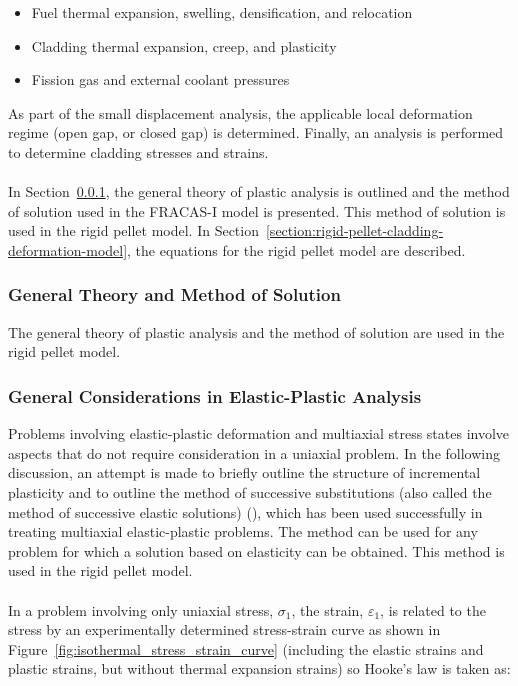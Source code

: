 \begin{itemize}
    \item Fuel thermal expansion, swelling, densification, and relocation

    \item Cladding thermal expansion, creep, and plasticity

    \item Fission gas and external coolant pressures

\end{itemize}

As part of the small displacement analysis, the applicable local deformation regime (open gap, or
closed gap) is determined. Finally, an analysis is performed to determine cladding stresses and
strains.
\\
\\
In Section~\ref{section:general-theory-and-method-of-solution}, the general theory of plastic
analysis is outlined and the method of solution used in the FRACAS-I model is presented. This method
of solution is used in the rigid pellet model. In
Section~\ref{section:rigid-pellet-cladding-deformation-model}, the equations for the rigid pellet
model are described.
\subsubsection{General Theory and Method of Solution}\label{section:general-theory-and-method-of-solution}

The general theory of plastic analysis and the method of solution are
used in the rigid pellet model.

\subsubsection{General Considerations in Elastic-Plastic Analysis}\label{section:general-considerations-in-elastic-plastic-analysis}

Problems involving elastic-plastic deformation and multiaxial stress states involve aspects that do
not require consideration in a uniaxial problem. In the following discussion, an attempt is made to
briefly outline the structure of incremental plasticity and to outline the method of successive
substitutions (also called the method of successive elastic solutions) (\cite{ref:Mendelson1968a}),
which has been used successfully in treating multiaxial elastic-plastic problems. The method can be
used for any problem for which a solution based on elasticity can be obtained.  This method is used
in the rigid pellet model.
\\
\\
In a problem involving only uniaxial stress, \(\sigma_{1}\), the strain, \(\varepsilon_{1}\), is
related to the stress by an experimentally determined stress-strain curve as shown in
Figure~\ref{fig:isothermal_stress_strain_curve} (including the elastic strains and plastic strains,
but without thermal expansion strains) so Hooke's law is taken as:

